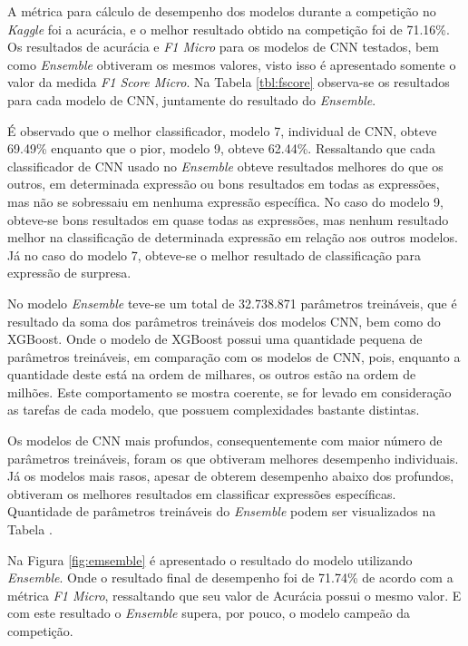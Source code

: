 A métrica para cálculo de desempenho dos modelos durante a competição no \emph{Kaggle} foi a acurácia, e o melhor resultado obtido na competição foi de 71.16\%. Os resultados de acurácia e \emph{F1 Micro} para os modelos de CNN testados, bem como \emph{Ensemble} obtiveram os mesmos valores, visto isso é apresentado somente o valor da medida \emph{F1 Score Micro}. Na Tabela \ref{tbl:fscore} observa-se os resultados para cada modelo de CNN, juntamente do resultado do \emph{Ensemble}.



É observado que o melhor classificador, modelo 7, individual de CNN, obteve 69.49\% enquanto que o pior, modelo 9, obteve 62.44\%. Ressaltando que cada classificador de CNN usado no \emph{Ensemble} obteve resultados melhores do que os outros, em determinada expressão ou bons resultados em todas as expressões, mas não se sobressaiu em nenhuma expressão específica. No caso do modelo 9, obteve-se bons resultados em quase todas as expressões, mas nenhum resultado melhor na classificação de determinada expressão em relação aos outros modelos. Já no caso do modelo 7, obteve-se o melhor resultado de classificação para expressão de surpresa.

No modelo \textit{Ensemble} teve-se um total de 32.738.871 parâmetros treináveis, que é resultado da soma dos parâmetros treináveis dos modelos CNN, bem como do XGBoost. Onde o modelo de XGBoost possui uma quantidade pequena de parâmetros treináveis, em comparação com os modelos de CNN, pois, enquanto a quantidade deste está na ordem de milhares, os outros estão na ordem de milhões. Este comportamento se mostra coerente, se for levado em consideração as tarefas de cada modelo, que possuem complexidades bastante distintas.

Os modelos de CNN mais profundos, consequentemente com maior número de parâmetros treináveis, foram os que obtiveram melhores desempenho individuais. Já os modelos mais rasos, apesar de obterem desempenho abaixo dos profundos, obtiveram os melhores resultados em classificar expressões específicas. Quantidade de parâmetros treináveis do \textit{Ensemble} podem ser visualizados na Tabela \cite{tbl:param}.



Na Figura \ref{fig:emsemble} é apresentado o resultado do modelo utilizando \emph{Ensemble}. Onde o resultado final de desempenho foi de 71.74\% de acordo com a métrica \emph{F1 Micro}, ressaltando que seu valor de Acurácia possui o mesmo valor. E com este resultado o \emph{Ensemble} supera, por pouco, o modelo campeão da competição.

